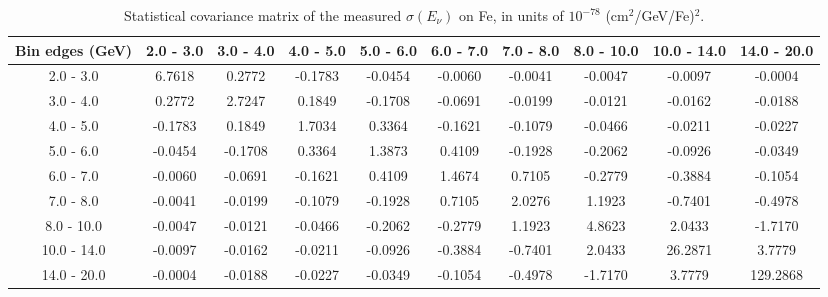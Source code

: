 \documentclass[aps,prl,twocolumn,superscriptaddress,nofootinbib]{revtex4-1}
\begin{document}
\begin{table}[h!]
  \centering
  \caption{Statistical covariance matrix of the measured $\sigma(E_{\nu})$ on Fe, in units of $10^{-78}$ (cm$^{2}$/GeV/Fe)$^{2}$.}
    \begin{tabular}{c||ccccccccc}
      Bin edges (GeV) & 2.0 - 3.0 & 3.0 - 4.0 & 4.0 - 5.0 & 5.0 - 6.0 & 6.0 - 7.0 & 7.0 - 8.0 & 8.0 - 10.0 & 10.0 - 14.0 & 14.0 - 20.0 \\
\hline \hline
        2.0 - 3.0 &  6.7618 &  0.2772 & -0.1783 & -0.0454 & -0.0060 & -0.0041 & -0.0047 & -0.0097 & -0.0004 \\
        3.0 - 4.0 &  0.2772 &  2.7247 &  0.1849 & -0.1708 & -0.0691 & -0.0199 & -0.0121 & -0.0162 & -0.0188 \\
        4.0 - 5.0 & -0.1783 &  0.1849 &  1.7034 &  0.3364 & -0.1621 & -0.1079 & -0.0466 & -0.0211 & -0.0227 \\
        5.0 - 6.0 & -0.0454 & -0.1708 &  0.3364 &  1.3873 &  0.4109 & -0.1928 & -0.2062 & -0.0926 & -0.0349 \\
        6.0 - 7.0 & -0.0060 & -0.0691 & -0.1621 &  0.4109 &  1.4674 &  0.7105 & -0.2779 & -0.3884 & -0.1054 \\
        7.0 - 8.0 & -0.0041 & -0.0199 & -0.1079 & -0.1928 &  0.7105 &  2.0276 &  1.1923 & -0.7401 & -0.4978 \\
       8.0 - 10.0 & -0.0047 & -0.0121 & -0.0466 & -0.2062 & -0.2779 &  1.1923 &  4.8623 &  2.0433 & -1.7170 \\
      10.0 - 14.0 & -0.0097 & -0.0162 & -0.0211 & -0.0926 & -0.3884 & -0.7401 &  2.0433 & 26.2871 &  3.7779 \\
      14.0 - 20.0 & -0.0004 & -0.0188 & -0.0227 & -0.0349 & -0.1054 & -0.4978 & -1.7170 &  3.7779 & 129.2868 \\
    \end{tabular}
  \label{tablecov:Fe_Statistical_Enu}
\end{table}
\end{document}
